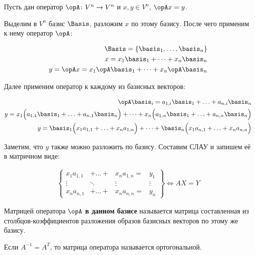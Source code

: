 
Пусть дан оператор \(\opA \colon V^{n} \to V^{n}\) и \(x, y \in V^{n}\),
\(\opA x = y\).

Выделим в \(V^{n}\) базис \(\Basis\), разложим \(x\) по этому базису.
После чего применим к нему оператор \(\opA\):

\begin{align*}
  \Basis = \{ \basis_{1}, \dots, \basis_{n} \} \\
  x = x_{1} \basis_{1} + \dots + x_{n} \basis_{n} \\
  y = \opA x = x_{1} \opA \basis_{1} + \dots + x_{n} \opA \basis_{n} \\
\end{align*}

Далее применим оператор к каждому из базисных векторов:

\begin{align*}
  \opA \basis_{i} = a_{1,i} \basis_{1} + \dotsc + a_{n, i} \basis_{n} \\
  y
  = x_{1} \Big( a_{1,1} \basis_{1} + \dotsc + a_{n,1} \basis_{n} \Big)
  + \dots
  + x_{n} \Big( a_{1,n} \basis_{1} + \dotsc + a_{n,n} \basis_{n} \Big) \\
  y
  = \basis_{1} \Big( x_{1} a_{1,1} + \dotsc + x_{n} a_{1,n} \Big)
  + \dots
  + \basis_{n} \Big( x_{1} a_{n,1} + \dotsc + x_{n} a_{n,n} \Big)
\end{align*}

Заметим, что \(y\) также можно разложить по базису. Составим СЛАУ и запишем её
в матричном виде:

\begin{align*}
  \begin{Bmatrix}
    x_{1} a_{1,1} & + \dotsc + & x_{n} a_{1,n} = & y_{1}  \\
    \vdots        & \ddots     & \vdots          & \vdots \\
    x_{n} a_{n,1} & + \dotsc + & x_{n} a_{n,n} = & y_{n} 
  \end{Bmatrix} \iff AX = Y
\end{align*}

\begin{definition}
  Матрицей оператора \(\opA\) \textbf{в данном базисе} называется матрица
  составленная из столбцов-коэффициентов разложения образов базисных векторов
  по этому же базису.
\end{definition}

\begin{remark}
  Если \(A^{-1} = A^{T}\), то матрица оператора называется ортогональной.
\end{remark}

